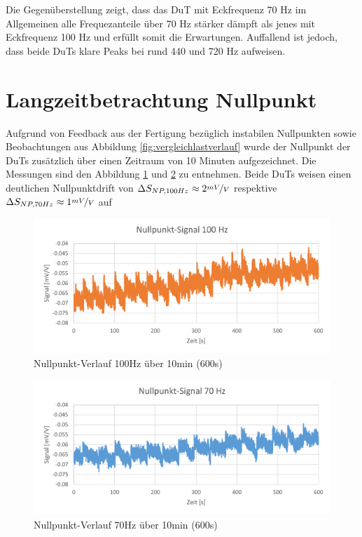 Die Gegenüberstellung zeigt, dass das DuT mit Eckfrequenz 70 Hz im Allgemeinen alle Frequezanteile über 70 Hz stärker dämpft als jenes mit Eckfrequenz 100 Hz und erfüllt somit die Erwartungen. Auffallend ist jedoch, dass beide DuTs klare Peaks bei rund 440 und 720 Hz aufweisen.
\section{Langzeitbetrachtung Nullpunkt}
Aufgrund von Feedback aus der Fertigung bezüglich instabilen Nullpunkten sowie Beobachtungen aus Abbildung \ref{fig:vergleichlastverlauf} wurde der Nullpunkt der DuTs zusätzlich über einen Zeitraum von 10 Minuten aufgezeichnet. Die Messungen sind den Abbildung \ref{fig:np100long} und \ref{fig:np70long} zu entnehmen. Beide DuTs weisen einen deutlichen Nullpunktdrift von $\Delta S_{NP,100Hz}\approx 2\nicefrac{mV}{V}$ respektive $\Delta S_{NP,70Hz}\approx 1\nicefrac{mV}{V}$ auf
\begin{figure}[H]
	\centering
	\includegraphics[width=1\linewidth]{imgs/NP100_Long}
	\caption{Nullpunkt-Verlauf 100Hz über 10min (600s)}
	\label{fig:np100long}
\end{figure}
\begin{figure}[H]
	\centering
	\includegraphics[width=1\linewidth]{imgs/NP70_Long}
	\caption{Nullpunkt-Verlauf 70Hz über 10min (600s)}
	\label{fig:np70long}
\end{figure}
